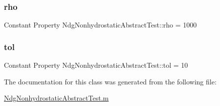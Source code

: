 \subsubsection{\texorpdfstring{rho}{rho}}
{\footnotesize\ttfamily Constant Property Ndg\+Nonhydrostatic\+Abstract\+Test\+::rho = 1000}

\mbox{\label{class_ndg_nonhydrostatic_abstract_test_a3859c87e1ad5683b16464201f2c5c129}} 
\subsubsection{\texorpdfstring{tol}{tol}}
{\footnotesize\ttfamily Constant Property Ndg\+Nonhydrostatic\+Abstract\+Test\+::tol = 10}



The documentation for this class was generated from the following file\+:\begin{DoxyCompactItemize}
\item 
\hyperlink{_ndg_nonhydrostatic_abstract_test_8m}{Ndg\+Nonhydrostatic\+Abstract\+Test.\+m}\end{DoxyCompactItemize}
